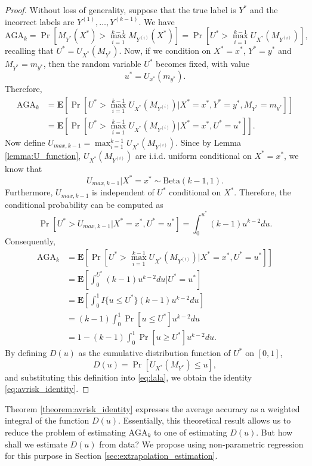 \documentclass[twoside,11pt]{article}
\newcommand{\E}{\textbf{E}}
\begin{document}
\begin{proof} Without loss of generality, suppose that the true label is $Y^*$ and
the incorrect labels are $Y^{(1)},\hdots, Y^{(k-1)}$.  We have
\[
\text{AGA}_k = \Pr[M_{Y^*}(X^*) > \max_{i=1}^{k-1} M_{Y^{(i)}}(X^*)]
= \Pr[U^* > \max_{i=1}^{k-1} U_{X^*}(M_{Y^{(i)}})],
\]
recalling that $U^* = U_{X^*}(M_{Y^*})$.  Now, if we condition on $X^*
= x^*$, $Y^* = y^*$ and $M_{Y^*} = m_{y^*}$, then the random variable
$U^*$ becomes fixed, with value
\[
u^* = U_{x^*}(m_{y^*}).
\]
Therefore,
\begin{align*}
\text{AGA}_k &=\E[\Pr[U^* > \max_{i=1}^{k-1} U_{X^*}(M_{Y^{(i)}})|X^* = x^*, Y^* = y^*, M_{Y^*} = m_{y^*}]]
\\&= \E[\Pr[U^* > \max_{i=1}^{k-1} U_{X^*}(M_{Y^{(i)}})|X^* = x^*, U^* = u^*]].
\end{align*}
Now define $U_{max, k-1} = \max_{i=1}^{k-1} U_{X^*}(M_{Y^{(i)}})$.
Since by Lemma \ref{lemma:U_function},
$U_{X^*}(M_{Y^{(i)}})$ are i.i.d. uniform conditional on $X^* = x^*$, we know that
\begin{equation}\label{eq:umax_beta}
U_{max, k-1}|X^* = x^* \sim \text{Beta}(k-1, 1).
\end{equation}
Furthermore, $U_{max, k-1}$ is independent of $U^*$ conditional on
$X^*$.  Therefore, the conditional probability can be computed as
\[
\Pr[U^* > U_{max, k-1}|X^* = x^*, U^* = u^*] = \int_0^{u^*} (k-1) u^{k-2} du.
\]
Consequently,
\begin{align}
\text{AGA}_k &= \E[\Pr[U^* > \max_{i=1}^{k-1} U_{X^*}(M_{Y^{(i)}})|X^* = x^*, U^* = u^*]]
\\&= \E[\int_0^{U^*} (k-1) u^{k-2} du|U^* = u^*]
\\&= \E[\int_0^1 I\{u \leq U^*\} (k-1) u^{k-2} du ]
\\&= (k-1) \int_0^1 \Pr[u \leq U^*] u^{k-2} du
\\&= 1 - (k-1) \int_0^1 \Pr[u \geq U^*] u^{k-2} du. \label{eq:lala}
\end{align}
By defining ${D}(u)$ as the cumulative distribution function of
$U^*$ on $[0,1]$,
\begin{equation}\label{eq:Kbar}
{D}(u) = \Pr[U_{X^*}(M_{Y^*}) \leq u],
\end{equation}
and substituting this definition into \eqref{eq:lala}, we obtain the identity \eqref{eq:avrisk_identity}.
\end{proof}


Theorem \ref{theorem:avrisk_identity} expresses the average accuracy
as a weighted integral of the function ${D}(u)$.  Essentially, this theoretical result allows us
to reduce the problem of estimating $\text{AGA}_k$ to one of estimating $D(u)$.
But how shall we estimate $D(u)$ from data?
We propose using non-parametric regression for this purpose in Section \ref{sec:extrapolation_estimation}.
\end{document}
